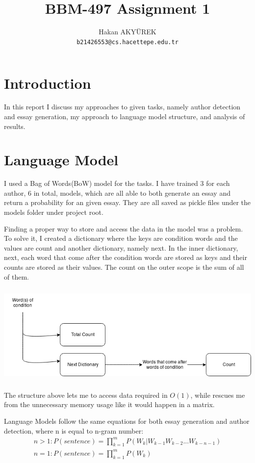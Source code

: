 \documentclass{article}
\title{BBM-497 Assignment 1}
\author{
  Hakan AKYÜREK \\
  \texttt{b21426553@cs.hacettepe.edu.tr} \\
}
\begin{document}
\maketitle

\section{Introduction}
In this report I discuss my approaches to given tasks, namely author detection and essay generation, my approach to language model structure, and analysis of results.
\section{Language Model}

I used a Bag of Words(BoW) model for the tasks. I have trained 3 for each author, 6 in total, models, which are all able to both generate an essay and return a probability for an given essay. They are all saved as pickle files under the models folder under project root.

Finding a proper way to store and access the data in the model was a problem. To solve it, I created a dictionary where the keys are condition words and the values are count and another dictionary, namely next. In the inner dictionary, next, each word that come after the condition words are stored as keys and their counts are stored as their values. The count on the outer scope is the sum of all of them.

\includegraphics[width=1\linewidth, height=5cm]{asdf}

The structure above lets me to access data required in $O(1)$, while rescues me from the unnecessary memory usage like it would happen in a matrix.

Language Models follow the same equations for both essay generation and author detection, where n is equal to n-gram number:
\begin{gather}
n > 1: P(sentence) = \prod_{k=1}^mP(W_k | W_{k-1} W_{k-2} ... W_{k-n-1}) \\
n = 1: P(sentence) = \prod_{k=1}^mP(W_k)
\end{gather}
\end{document}
